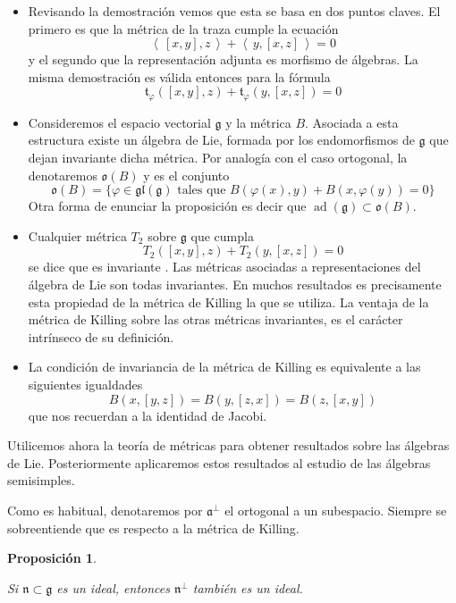 \documentclass[a4paper,draft,12pt]{article}
\newtheorem{propo}[teo]{Proposición}%
\newcommand{\g}{\mathfrak{g}}%
\newcommand{\escalar}[2]{\left\langle\, #1,#2\, \right\rangle}  %
\newcommand{\df}[1]{\textsf{\color{blue}#1}}
\DeclareMathOperator{\ad}{ad}  %
\begin{document}

\begin{itemize}

\item Revisando la demostración vemos que esta  se basa en dos puntos claves.  El primero es que la métrica de la traza cumple la ecuación
$$
\escalar{[x,y]}{z}+\escalar{y}{[x,z]}=0
$$
y el segundo que la representación adjunta es morfismo de álgebras.  La misma demostración es válida entonces para la fórmula
$$
\mathfrak{t}_\varphi([x,y],z) + \mathfrak{t}_\varphi(y,[x,z])=0
$$

\item Consideremos el espacio vectorial $\g$ y la métrica $B$.  Asociada a esta estructura existe un álgebra de Lie, formada por los endomorfismos de $ \g$ que dejan invariante dicha métrica.  Por analogía con el caso ortogonal, la denotaremos $\mathfrak{o}(B)$ y es el conjunto
$$
\mathfrak{o}(B)= \{ \varphi \in \mathfrak{gl}(\g) \text{ tales que } B(\varphi(x),y)+ B(x,\varphi(y))=0\}
$$
Otra forma de enunciar la proposición es decir que $\ad(\g) \subset \mathfrak{o}(B)$.

\item Cualquier métrica $T_2$ sobre $\g$ que cumpla
$$
T_2([x,y],z)+T_2(y,[x,z])=0
$$
se dice que es  \df{invariante} .  Las métricas asociadas a representaciones del álgebra de Lie son todas invariantes.  En muchos resultados es precisamente esta propiedad de la métrica de Killing la que se utiliza.  La ventaja de la métrica de Killing sobre las otras métricas invariantes, es el carácter intrínseco de su definición.

\item La condición de invariancia de la métrica de Killing es equivalente a las siguientes igualdades
$$
B(x,[y,z]) = B(y,[z,x])= B(z,[x,y])
$$
que nos recuerdan a la identidad de Jacobi.


\end{itemize}

Utilicemos ahora la teoría de métricas para obtener resultados sobre las álgebras de Lie.  Posteriormente aplicaremos estos resultados al estudio de las álgebras semisimples.

Como es habitual, denotaremos por $\mathfrak{a}^\perp$ el ortogonal a un subespacio.  Siempre se sobreentiende que es respecto a la métrica de Killing.

\begin{propo}\label{propo:ideal}

Si $\mathfrak{n}\subset \g$ es un ideal, entonces $\mathfrak{n}^\perp$ también es un ideal.

\end{propo}
\end{document}
